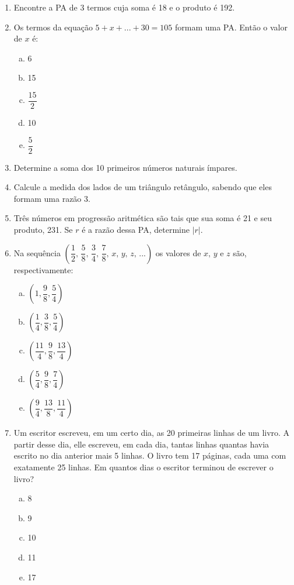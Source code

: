\documentclass[a4paper,12pt, twocolumn]{article}
\begin{document}
\begin{enumerate}[1°)]
	\item Encontre a PA de 3 termos cuja soma é 18 e o produto é 192.
	\item Os termos da equação $5+x+...+30=105$ formam uma PA. Então o valor de $x$ é:
	\begin{enumerate}[a)]
		\item 6
		\item 15
		\item $\dfrac{15}{2}$
		\item 10
		\item $\dfrac{5}{2}$
	\end{enumerate}
	\item Determine a soma dos 10 primeiros números naturais ímpares.
	\item Calcule a medida dos lados de um triângulo retângulo, sabendo que eles formam uma razão 3.
	\item Três números em progressão aritmética são tais que sua soma é 21 e seu produto, 231. Se $r$ é a razão dessa PA, determine $|r|$.
	\item Na sequência $\left(\dfrac{1}{2},\, \dfrac{5}{8},\, \dfrac{3}{4},\, \dfrac{7}{8},\, x,\, y,\, z,\, ... \right)$ os valores de $x,\, y$ e $z$ são, respectivamente:
	\begin{enumerate}[a)]
		\item $\left(1, \dfrac{9}{8}, \dfrac{5}{4} \right)$
		\item $\left(\dfrac{1}{4}, \dfrac{3}{8}, \dfrac{5}{4} \right)$
		\item $\left(\dfrac{11}{4}, \dfrac{9}{8}, \dfrac{13}{4} \right)$
		\item $\left(\dfrac{5}{4}, \dfrac{9}{8}, \dfrac{7}{4} \right)$
		\item $\left(\dfrac{9}{4}, \dfrac{13}{8}, \dfrac{11}{4} \right)$
	\end{enumerate}
	\item Um escritor escreveu, em um certo dia, as 20 primeiras linhas de um livro. A partir desse dia, elle escreveu, em cada dia, tantas linhas quantas havia escrito no dia anterior mais 5 linhas. O livro tem 17 páginas, cada uma com exatamente 25 linhas. Em quantos dias o escritor terminou de escrever o livro?
	\begin{enumerate}[a)]
		\item 8
		\item 9
		\item 10
		\item 11
		\item 17

\end{enumerate}
\end{enumerate}
\end{document}
